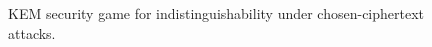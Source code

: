 \begin{figure}[t]
% 		
% 		
% 			
% 		
% 		
% 		
% 
% 
% 		
% 
% 
% 
	\caption{%
		KEM security game for indistinguishability under  chosen-ciphertext attacks. %
	}
	\label{fig:KEM}
	\hrulefill
\end{figure}


